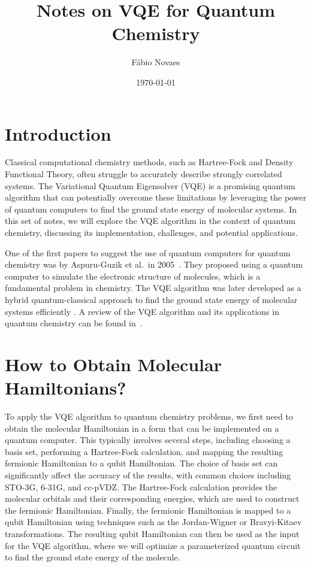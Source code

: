 \documentclass[12pt]{article}
\title{Notes on VQE for Quantum Chemistry}
\author[a]{Fábio Novaes}
\affiliation[a]{Federal Rural University of Pernambuco}
\date{\today}
\begin{document}
\maketitle

\section{Introduction}

Classical computational chemistry methods, such as Hartree-Fock and Density Functional Theory, often struggle to accurately describe strongly correlated systems. The Variational Quantum Eigensolver (VQE) is a promising quantum algorithm that can potentially overcome these limitations by leveraging the power of quantum computers to find the ground state energy of molecular systems. In this set of notes, we will explore the VQE algorithm in the context of quantum chemistry, discussing its implementation, challenges, and potential applications.

One of the first papers to suggest the use of quantum computers for quantum chemistry was by Aspuru-Guzik et al.~in 2005~\cite{aspuru-guzikSimulatedQuantumComputation2005}. They proposed using a quantum computer to simulate the electronic structure of molecules, which is a fundamental problem in chemistry. The VQE algorithm was later developed as a hybrid quantum-classical approach to find the ground state energy of molecular systems efficiently \cite{peruzzo2014variational,mcclean2016theory}. A review of the VQE algorithm and its applications in quantum chemistry can be found in~\cite{cerezoVariationalQuantumAlgorithms2021}. 

\section{How to Obtain Molecular Hamiltonians?}

To apply the VQE algorithm to quantum chemistry problems, we first need to obtain the molecular Hamiltonian in a form that can be implemented on a quantum computer. This typically involves several steps, including choosing a basis set, performing a Hartree-Fock calculation, and mapping the resulting fermionic Hamiltonian to a qubit Hamiltonian. The choice of basis set can significantly affect the accuracy of the results, with common choices including STO-3G, 6-31G, and cc-pVDZ. The Hartree-Fock calculation provides the molecular orbitals and their corresponding energies, which are used to construct the fermionic Hamiltonian. Finally, the fermionic Hamiltonian is mapped to a qubit Hamiltonian using techniques such as the Jordan-Wigner or Bravyi-Kitaev transformations. The resulting qubit Hamiltonian can then be used as the input for the VQE algorithm, where we will optimize a parameterized quantum circuit to find the ground state energy of the molecule. 
\end{document}
